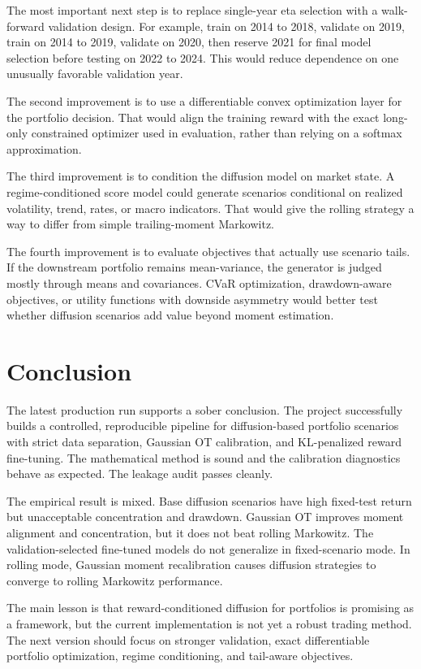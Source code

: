 \documentclass{article}
\begin{document}
The most important next step is to replace single-year eta selection with a
walk-forward validation design. For example, train on 2014 to 2018, validate on
2019, train on 2014 to 2019, validate on 2020, then reserve 2021 for final
model selection before testing on 2022 to 2024. This would reduce dependence on
one unusually favorable validation year.

The second improvement is to use a differentiable convex optimization layer for
the portfolio decision. That would align the training reward with the exact
long-only constrained optimizer used in evaluation, rather than relying on a
softmax approximation.

The third improvement is to condition the diffusion model on market state. A
regime-conditioned score model could generate scenarios conditional on realized
volatility, trend, rates, or macro indicators. That would give the rolling
strategy a way to differ from simple trailing-moment Markowitz.

The fourth improvement is to evaluate objectives that actually use scenario
tails. If the downstream portfolio remains mean-variance, the generator is judged
mostly through means and covariances. CVaR optimization, drawdown-aware
objectives, or utility functions with downside asymmetry would better test
whether diffusion scenarios add value beyond moment estimation.

\section{Conclusion}

The latest production run supports a sober conclusion. The project successfully
builds a controlled, reproducible pipeline for diffusion-based portfolio
scenarios with strict data separation, Gaussian OT calibration, and
KL-penalized reward fine-tuning. The mathematical method is sound and the
calibration diagnostics behave as expected. The leakage audit passes cleanly.

The empirical result is mixed. Base diffusion scenarios have high fixed-test
return but unacceptable concentration and drawdown. Gaussian OT improves moment
alignment and concentration, but it does not beat rolling Markowitz. The
validation-selected fine-tuned models do not generalize in fixed-scenario mode.
In rolling mode, Gaussian moment recalibration causes diffusion strategies to
converge to rolling Markowitz performance.

The main lesson is that reward-conditioned diffusion for portfolios is promising
as a framework, but the current implementation is not yet a robust trading
method. The next version should focus on stronger validation, exact
differentiable portfolio optimization, regime conditioning, and tail-aware
objectives.
\end{document}
